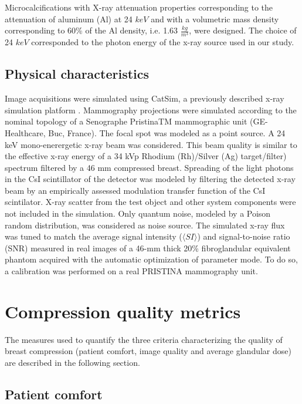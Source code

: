 Microcalcifications with X-ray attenuation properties corresponding to the attenuation of aluminum (Al) at 24 $keV$ and with a volumetric mass density corresponding to 60\% of the Al density, i.e. 1.63 $\frac{kg}{m^3}$, were designed. 
The choice of 24 $keV$ corresponded to the photon energy of the x-ray source used in our study. 


\subsection{Physical characteristics}

Image acquisitions were simulated using CatSim, a previously described x-ray simulation platform \cite{de_low_2014,de_catsim_2007}. Mammography projections were simulated according to the nominal topology of a Senographe PristinaTM mammographic unit (GE-Healthcare, Buc, France). The focal spot was modeled as a point source. A 24 keV mono-enerergetic x-ray beam was considered.  This beam quality is similar to the effective x-ray energy of a 34 kVp Rhodium (Rh)/Silver (Ag) target/filter) spectrum filtered by a 46 mm compressed breast. Spreading of the light photons in the CsI scintillator of the detector was modeled by filtering the detected x-ray beam by an empirically assessed modulation transfer function of the CsI scintilator. X-ray scatter from the test object and other system components were not included in the simulation. Only quantum noise, modeled by a Poison random distribution, was considered as noise source. The simulated x-ray flux was tuned to match the average signal intensity ($\langle SI \rangle$) and signal-to-noise ratio (SNR) measured in real images of a 46-mm thick 20\% fibroglandular equivalent phantom acquired with the automatic optimization of parameter mode. To do so, a calibration was performed on a real PRISTINA mammography unit. 


\section{Compression quality metrics}\label{section:compressionqualitymetrics}

The measures used to quantify the three criteria characterizing the quality of breast compression (patient comfort, image quality and average glandular dose) are described in the following section.  

\subsection{Patient comfort}

